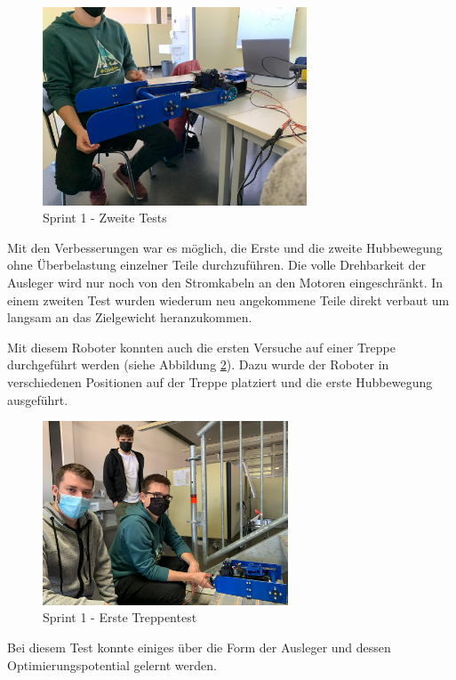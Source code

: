 \begin{figure}[H]
  \includegraphics[width=0.7\textwidth]{img/Sprint1/pren1_sprint1_2.png}
  \centering
  \caption{Sprint 1 - Zweite Tests}
  \label{fig:zweiteTests}
\end{figure}

Mit den Verbesserungen war es möglich, die Erste und die zweite Hubbewegung ohne Überbelastung einzelner Teile durchzuführen.
Die volle Drehbarkeit der Ausleger wird nur noch von den Stromkabeln an den Motoren eingeschränkt. In einem zweiten Test wurden wiederum neu angekommene Teile direkt verbaut um langsam an das Zielgewicht heranzukommen.

Mit diesem Roboter konnten auch die ersten Versuche auf einer Treppe durchgeführt werden (siehe Abbildung \ref{fig:ersteTreppentests}). Dazu wurde der Roboter in verschiedenen Positionen auf der Treppe platziert und die erste Hubbewegung ausgeführt.

\begin{figure}[H]
  \includegraphics[width=0.65\textwidth]{img/Sprint1/pren1_sprint1_3.png}
  \centering
  \caption{Sprint 1 - Erste Treppentest}
  \label{fig:ersteTreppentests}
\end{figure}

Bei diesem Test konnte einiges über die Form der Ausleger und dessen Optimierungspotential gelernt werden.

